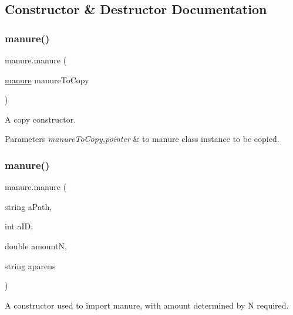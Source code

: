 \subsection{Constructor \& Destructor Documentation}
\mbox{\label{classmanure_a38ddb577591d36f8bd5e4c7d8fed6d51}} 
\subsubsection{\texorpdfstring{manure()}{manure()}\hspace{0.1cm}{\footnotesize\ttfamily [1/2]}}
{\footnotesize\ttfamily manure.\+manure (\begin{DoxyParamCaption}\item[{\mbox{\hyperlink{classmanure}{manure}}}]{manure\+To\+Copy }\end{DoxyParamCaption})\hspace{0.3cm}{\ttfamily [inline]}}



A copy constructor. 


\begin{DoxyParams}{Parameters}
{\em manure\+To\+Copy,pointer} & to manure class instance to be copied. \\
\hline
\end{DoxyParams}
\mbox{\label{classmanure_afb980a45746d9065d8c76ff38e55970a}} 
\subsubsection{\texorpdfstring{manure()}{manure()}\hspace{0.1cm}{\footnotesize\ttfamily [2/2]}}
{\footnotesize\ttfamily manure.\+manure (\begin{DoxyParamCaption}\item[{string}]{a\+Path,  }\item[{int}]{a\+ID,  }\item[{double}]{amountN,  }\item[{string}]{aparens }\end{DoxyParamCaption})\hspace{0.3cm}{\ttfamily [inline]}}



A constructor used to import manure, with amount determined by N required. 


